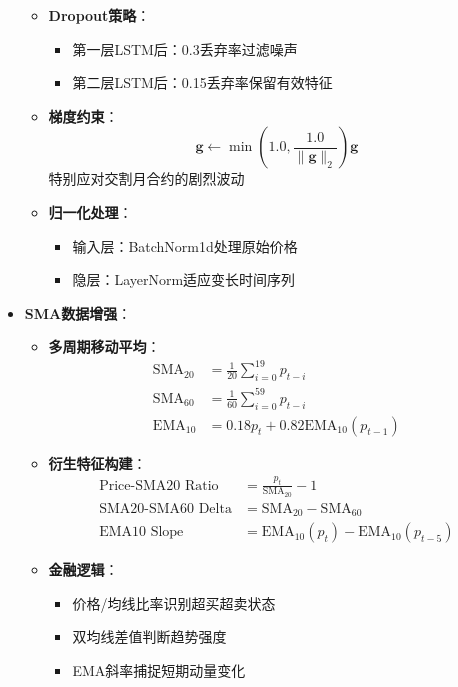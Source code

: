 \documentclass[a4paper,12pt]{ctexart}
\begin{document}
\begin{itemize}
\begin{itemize}
\item \textbf{Dropout策略}：
  \begin{itemize}
  \item 第一层LSTM后：0.3丢弃率过滤噪声
  \item 第二层LSTM后：0.15丢弃率保留有效特征
  \end{itemize}

\item \textbf{梯度约束}：
  \[
  \mathbf{g} \leftarrow \min\left(1.0, \frac{1.0}{\|\mathbf{g}\|_2}\right)\mathbf{g}
  \]
  特别应对交割月合约的剧烈波动

\item \textbf{归一化处理}：
  \begin{itemize}
  \item 输入层：BatchNorm1d处理原始价格
  \item 隐层：LayerNorm适应变长时间序列
  \end{itemize}
\end{itemize}


\item \textbf{SMA数据增强}：
  \begin{itemize}
  \item \textbf{多周期移动平均}：
    \begin{align*}
    \text{SMA}_{20} &= \frac{1}{20}\sum_{i=0}^{19} p_{t-i} \\
    \text{SMA}_{60} &= \frac{1}{60}\sum_{i=0}^{59} p_{t-i} \\
    \text{EMA}_{10} &= 0.18p_t + 0.82\text{EMA}_{10}(p_{t-1})
    \end{align*}
    
  \item \textbf{衍生特征构建}：
    \begin{equation*}
    \begin{aligned}
    \text{Price-SMA20 Ratio} &= \frac{p_t}{\text{SMA}_{20}} - 1 \\
    \text{SMA20-SMA60 Delta} &= \text{SMA}_{20} - \text{SMA}_{60} \\
    \text{EMA10 Slope} &= \text{EMA}_{10}(p_t) - \text{EMA}_{10}(p_{t-5})
    \end{aligned}
    \end{equation*}
    
  \item \textbf{金融逻辑}：
    \begin{itemize}
    \item 价格/均线比率识别超买超卖状态
    \item 双均线差值判断趋势强度
    \item EMA斜率捕捉短期动量变化
    \end{itemize}
  \end{itemize}
\end{itemize}
\end{document}
